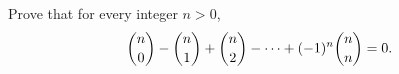 Prove that for every integer $n>0$,
\[\dbinom n0-\dbinom n1+\dbinom n2-\cdots+(-1)^n\dbinom nn=0.\]
